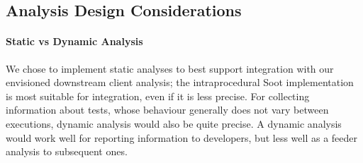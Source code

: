 \subsection{Analysis Design Considerations}
\label{subsec:analysis-design}
\paragraph{Static vs Dynamic Analysis}
We chose to implement static analyses to best support integration with our envisioned downstream client analysis; the intraprocedural Soot implementation is most suitable for integration, even if it is less precise. For collecting information about tests, whose behaviour generally does not vary between executions, dynamic analysis would also be quite precise. A dynamic analysis would work well for reporting information to developers, but less well as a feeder analysis to subsequent ones.

